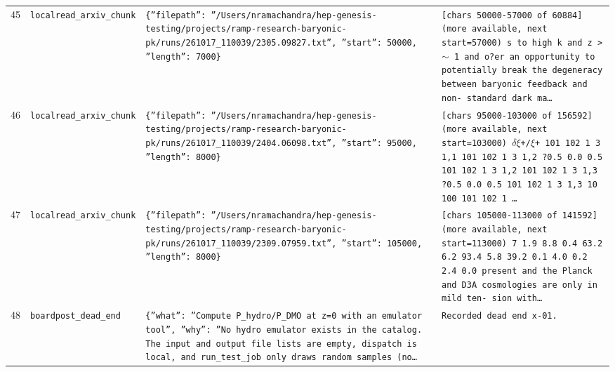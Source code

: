 \documentclass[11pt,a4paper]{article}
\begin{document}
\begin{longtable}{@{}p{}p{}p{}p{}@{}}
45 & \texttt{local}\newline\texttt{read\_\allowbreak{}arxiv\_\allowbreak{}chunk} & \texttt{\{''filepath'':\allowbreak{} ''/\allowbreak{}Users/\allowbreak{}nramachandra/\allowbreak{}hep-genesis-testing/\allowbreak{}projects/\allowbreak{}ramp-research-baryonic-pk/\allowbreak{}runs/\allowbreak{}261017\_\allowbreak{}110039/\allowbreak{}2305.09827.txt'',\allowbreak{} ''start'':\allowbreak{} 50000,\allowbreak{} ''length'':\allowbreak{} 7000\}\allowbreak{}} & \texttt{[chars 50000-57000 of 60884]\allowbreak{} (more available,\allowbreak{} next start=\allowbreak{}57000)\allowbreak{}  s to high k and z \textgreater{}\allowbreak{} $\sim$ 1 and o?er an opportunity to potentially break the degeneracy between baryonic feedback and non- standard dark ma\ldots{}\allowbreak{}} \\
46 & \texttt{local}\newline\texttt{read\_\allowbreak{}arxiv\_\allowbreak{}chunk} & \texttt{\{''filepath'':\allowbreak{} ''/\allowbreak{}Users/\allowbreak{}nramachandra/\allowbreak{}hep-genesis-testing/\allowbreak{}projects/\allowbreak{}ramp-research-baryonic-pk/\allowbreak{}runs/\allowbreak{}261017\_\allowbreak{}110039/\allowbreak{}2404.06098.txt'',\allowbreak{} ''start'':\allowbreak{} 95000,\allowbreak{} ''length'':\allowbreak{} 8000\}\allowbreak{}} & \texttt{[chars 95000-103000 of 156592]\allowbreak{} (more available,\allowbreak{} next start=\allowbreak{}103000)\allowbreak{}  $\delta$$\xi$+/\allowbreak{}$\xi$+ 101 102 1 3 1,\allowbreak{}1 101 102 1 3  1,\allowbreak{}2 ?0.5 0.0 0.5 101 102 1 3 1,\allowbreak{}2 101 102 1 3  1,\allowbreak{}3 ?0.5 0.0 0.5 101 102 1 3 1,\allowbreak{}3 10 100 101 102 1 \ldots{}\allowbreak{}} \\
47 & \texttt{local}\newline\texttt{read\_\allowbreak{}arxiv\_\allowbreak{}chunk} & \texttt{\{''filepath'':\allowbreak{} ''/\allowbreak{}Users/\allowbreak{}nramachandra/\allowbreak{}hep-genesis-testing/\allowbreak{}projects/\allowbreak{}ramp-research-baryonic-pk/\allowbreak{}runs/\allowbreak{}261017\_\allowbreak{}110039/\allowbreak{}2309.07959.txt'',\allowbreak{} ''start'':\allowbreak{} 105000,\allowbreak{} ''length'':\allowbreak{} 8000\}\allowbreak{}} & \texttt{[chars 105000-113000 of 141592]\allowbreak{} (more available,\allowbreak{} next start=\allowbreak{}113000)\allowbreak{}  7 1.9 8.8 0.4 63.2 6.2 93.4 5.8 39.2 0.1 4.0 0.2 2.4 0.0 present and the Planck and D3A cosmologies are only in mild ten- sion with\ldots{}\allowbreak{}} \\
48 & \texttt{board}\newline\texttt{post\_\allowbreak{}dead\_\allowbreak{}end} & \texttt{\{''what'':\allowbreak{} ''Compute P\_\allowbreak{}hydro/\allowbreak{}P\_\allowbreak{}DMO at z=\allowbreak{}0 with an emulator tool'',\allowbreak{} ''why'':\allowbreak{} ''No hydro emulator exists in the catalog. The input and output file lists are empty,\allowbreak{} dispatch is local,\allowbreak{} and run\_\allowbreak{}test\_\allowbreak{}job only draws random samples (no\ldots{}\allowbreak{}} & \texttt{Recorded dead end x-01.} \\

\end{longtable}
\end{document}

